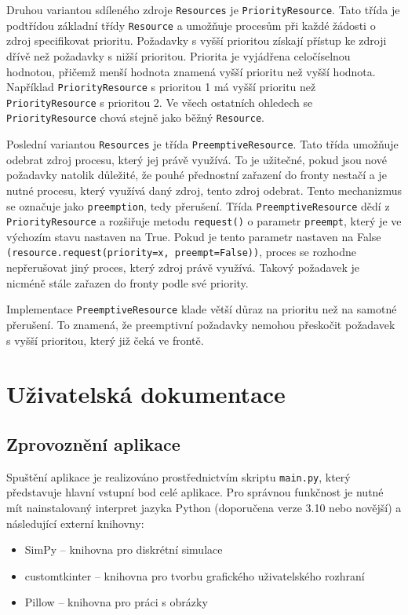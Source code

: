 \documentclass[
  program=itp,
  biblatex,
  figures=false,
  glossaries,
  index
]{kidiplom}
\begin{document}
Druhou variantou sdíleného zdroje \texttt{Resources} je \texttt{PriorityResource}. Tato třída je podtřídou základní třídy \texttt{Resource} a umožňuje procesům při každé žádosti o zdroj specifikovat prioritu. Požadavky s vyšší prioritou získají přístup ke zdroji dřívě než požadavky s nižší prioritou. Priorita je vyjádřena celočíselnou hodnotou, přičemž menší hodnota znamená vyšší prioritu než vyšší hodnota. Například \texttt{PriorityResource} s prioritou 1 má vyšší prioritu než \texttt{PriorityResource} s prioritou 2. Ve všech ostatních ohledech se \texttt{PriorityResource} chová stejně jako běžný \texttt{Resource}.

Poslední variantou \texttt{Resources} je třída \texttt{PreemptiveResource}. Tato třída umožňuje odebrat zdroj procesu, který jej právě využívá. To je užitečné, pokud jsou nové požadavky natolik důležité, že pouhé přednostní zařazení do fronty nestačí a je nutné procesu, který využívá daný zdroj, tento zdroj odebrat. Tento mechanizmus se označuje jako \texttt{preemption}, tedy přerušení. Třída \texttt{PreemptiveResource} dědí z \texttt{PriorityResource} a rozšiřuje metodu \texttt{request()} o parametr \texttt{preempt}, který je ve výchozím stavu nastaven na True. Pokud je tento parametr nastaven na False \texttt{(resource.request(priority=x, preempt=False))}, proces se rozhodne nepřerušovat jiný proces, který zdroj právě využívá. Takový požadavek je nicméně stále zařazen do fronty podle své priority.

Implementace \texttt{PreemptiveResource} klade větší důraz na prioritu než na samotné přerušení. To znamená, že preemptivní požadavky nemohou přeskočit požadavek s vyšší prioritou, který již čeká ve frontě. 

\section{Uživatelská dokumentace}
\subsection{Zprovoznění aplikace}

Spuštění aplikace je realizováno prostřednictvím skriptu \texttt{main.py}, který představuje hlavní vstupní bod celé aplikace. Pro správnou funkčnost je nutné mít nainstalovaný interpret jazyka Python (doporučena verze 3.10 nebo novější) a následující externí knihovny:

\begin{itemize}
    \item SimPy – knihovna pro diskrétní simulace
    \item customtkinter – knihovna pro tvorbu grafického uživatelského rozhraní
    \item Pillow – knihovna pro práci s obrázky
\end{itemize}
\end{document}
